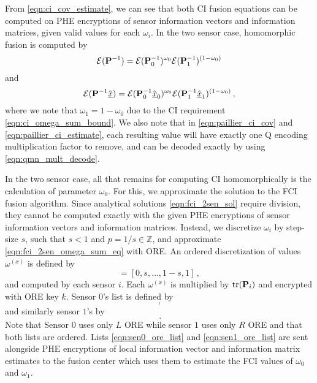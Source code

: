 \documentclass[letterpaper, 10 pt, conference]{ieeeconf}  %
\begin{document}
From \eqref{eqn:ci_cov_estimate}, we can see that both CI fusion equations can be computed on PHE encryptions of sensor information vectors and information matrices, given valid values for each $\omega_i$. In the two sensor case, homomorphic fusion is computed by
\begin{equation}
   \mathcal{E}({{\mathbf{P}}}^{-1}) = \mathcal{E}({{\mathbf{P}}}^{-1}_0)^{\omega_0}\mathcal{E}({{\mathbf{P}}}^{-1}_1)^{(1 -\omega_0)} \label{eqn:paillier_ci_cov}
\end{equation}
and
\begin{equation}
   \mathcal{E}({{\mathbf{P}}}^{-1}\hat{{\underline{x}}}) = \mathcal{E}({{\mathbf{P}}}^{-1}_0\hat{{\underline{x}}}_0)^{\omega_0}\mathcal{E}({{\mathbf{P}}}^{-1}_1\hat{{\underline{x}}}_1)^{(1 - \omega_0)}\,, \label{eqn:paillier_ci_estimate}
\end{equation}
where we note that $\omega_1=1-\omega_0$ due to the CI requirement \eqref{eqn:ci_omega_sum_bound}. We also note that in \eqref{eqn:paillier_ci_cov} and \eqref{eqn:paillier_ci_estimate}, each resulting value will have exactly one Q encoding multiplication factor to remove, and can be decoded exactly by using \eqref{eqn:qmn_mult_decode}.

In the two sensor case, all that remains for computing CI homomorphically is the calculation of parameter $\omega_0$. For this, we approximate the solution to the FCI fusion algorithm. Since analytical solutions \eqref{eqn:fci_2sen_sol} require division, they cannot be computed exactly with the given PHE encryptions of sensor information vectors and information matrices. Instead, we discretize $\omega_i$ by step-size $s$, such that $s<1$ and $p=1/s \in \mathbb{Z}$, and approximate \eqref{eqn:fci_2sen_omega_sum_eq} with ORE. An ordered discretization of values $\omega^{(x)}$ is defined by
\begin{equation}
   [\omega^{(0)},\dots,\omega^{(p)}] = [0,s,\dots,1-s,1]\,,
\end{equation}
and computed by each sensor $i$. Each $\omega^{(x)}$ is multiplied by $\operatorname{tr}({{\mathbf{P}}}_i)$ and encrypted with ORE key $k$. Sensor $0$'s list is defined by 
\begin{equation}
   [\mathcal{E}^L_{ORE}(\omega^{(0)}\tr(\mP_0)),\dots,\mathcal{E}^L_{ORE}(\omega^{(p)}\tr(\mP_0))]\,, \label{eqn:sen0_ore_list}
\end{equation}
and similarly sensor $1$'s by
\begin{equation}
   [\mathcal{E}^R_{ORE}(\omega^{(0)}\tr(\mP_1)),\dots,\mathcal{E}^R_{ORE}(\omega^{(p)}\tr(\mP_1))]\,. \label{eqn:sen1_ore_list}
\end{equation}
Note that Sensor $0$ uses only $L$ ORE while sensor $1$ uses only $R$ ORE and that both lists are ordered. Lists \eqref{eqn:sen0_ore_list} and \eqref{eqn:sen1_ore_list} are sent alongside PHE encryptions of local information vector and information matrix estimates to the fusion center which uses them to estimate the FCI values of $\omega_0$ and $\omega_1$.
\end{document}
